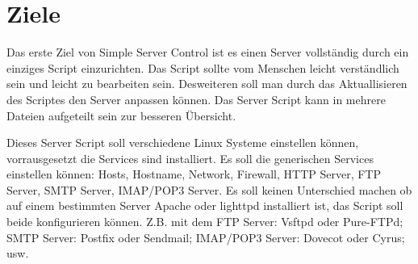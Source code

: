 \section{Ziele}

Das erste Ziel von Simple Server Control ist es einen Server vollständig
durch ein einziges Script einzurichten. Das Script sollte vom Menschen leicht
verständlich sein und leicht zu bearbeiten sein. Desweiteren soll man durch das
Aktuallisieren des Scriptes den Server anpassen können. Das Server Script kann
in mehrere Dateien aufgeteilt sein zur besseren Übersicht.

Dieses Server Script soll verschiedene Linux Systeme einstellen können,
vorrausgesetzt die Services sind installiert. Es soll die generischen Services
einstellen können: Hosts, Hostname, Network, Firewall, HTTP Server, FTP Server,
SMTP Server, IMAP/POP3 Server. Es soll keinen Unterschied machen ob auf einem
bestimmten Server Apache oder lighttpd installiert ist, das Script soll beide
konfigurieren können. Z.B. mit dem FTP Server: Vsftpd oder Pure-FTPd; SMTP
Server: Postfix oder Sendmail; IMAP/POP3 Server: Dovecot oder Cyrus; usw.
